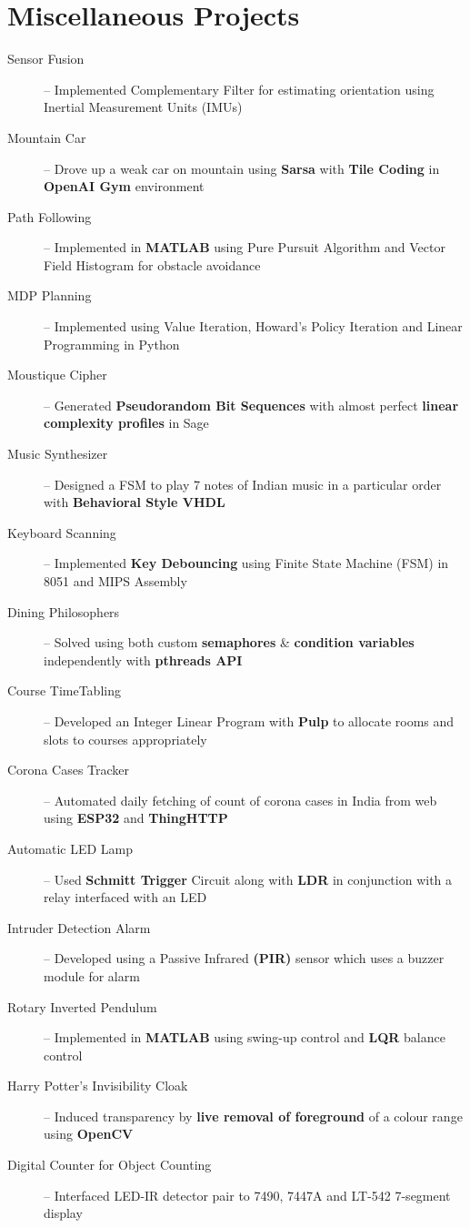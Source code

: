 \documentclass[10pt,a4paper,sans]{moderncv}        %
\begin{document}
\section{Miscellaneous Projects}
\begin{description}
	\item[Sensor Fusion] -- Implemented Complementary Filter %
	 for estimating orientation using Inertial Measurement Units (IMUs)
	\item[Mountain Car] -- Drove up a weak car on mountain using \textbf{Sarsa} with \textbf{Tile Coding} in \textbf{OpenAI Gym} environment%
	\item[Path Following] -- Implemented in \textbf{MATLAB} using Pure Pursuit Algorithm and Vector Field Histogram for obstacle avoidance
	\item[MDP Planning] -- Implemented using Value Iteration, Howard's Policy Iteration and Linear Programming in {Python}
	\item[Moustique Cipher] -- Generated \textbf{Pseudorandom Bit Sequences} with almost perfect \textbf{linear complexity profiles} in Sage %
	\item[Music Synthesizer] -- Designed a FSM to play 7 notes of Indian music in a particular order with \textbf{Behavioral Style VHDL}%
	\item[Keyboard Scanning] -- Implemented \textbf{Key Debouncing} using Finite State Machine (FSM) in 8051 and MIPS Assembly
	\item[Dining Philosophers] -- Solved using both custom \textbf{semaphores} \& \textbf{condition variables} independently with \textbf{pthreads API} %
	\item[Course TimeTabling] -- Developed an Integer Linear Program with \textbf{Pulp} to allocate rooms and slots to courses appropriately%
	\item[Corona Cases Tracker] -- {Automated} daily fetching of count of corona cases in India from web using \textbf{ESP32} and \textbf{ThingHTTP}
	\item[Automatic LED Lamp] -- Used \textbf{Schmitt Trigger} Circuit along with \textbf{LDR} in conjunction with a relay interfaced with an LED
	\item[Intruder Detection Alarm] -- Developed using a Passive Infrared \textbf{(PIR)} sensor which uses a buzzer module for alarm
	\item[Rotary Inverted Pendulum] -- Implemented in \textbf{MATLAB} using swing-up control and \textbf{LQR} balance control
	\item[Harry Potter's Invisibility Cloak] -- Induced transparency by \textbf{live removal of foreground} of a colour range using \textbf{OpenCV}
	\item[Digital Counter for Object Counting] -- Interfaced LED-IR detector pair to 7490, 7447A and LT-542 7-segment display%
\end{description}
\end{document}
